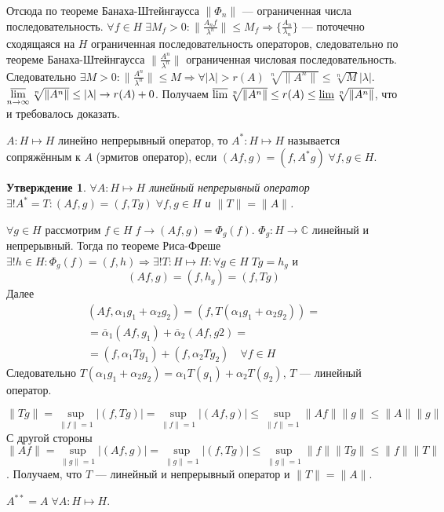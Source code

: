 \documentclass[12pt]{article}
\begin{document}
\begin{Proof}
    Отсюда по теореме Банаха-Штейнгаусса $\|\Phi_n\|$ --- ограниченная числа последовательность. $\forall f \in H\;\exists M_f > 0\colon \|\frac{A_n f}{\lambda^n}\|
    \le M_f \Rightarrow \{\frac{A_n}{\lambda_n}\}$ --- поточечно сходящаяся на $H$ ограниченная последовательность операторов, следовательно
    по теореме Банаха-Штейнгаусса $\|\frac{A^n}{\lambda^n}\|$ ограниченная числовая последовательность.
    Следовательно $\exists M>0\colon \|\frac{A^n}{\lambda^n}\| \le M \Rightarrow \forall |\lambda| > r(A)\;\sqrt[n]{\|A^n\|} \le \sqrt[n]{M}|\lambda|$.
    $\varlimsup\limits_{n \to \infty} \sqrt[n]{\|A^n\|} \le |\lambda| \to r(A) + 0$.
    Получаем $\varlimsup\sqrt[n]{\|A^n\|} \le r(A) \le \varliminf\sqrt[n]{\|A^n\|}$, что и требовалось доказать.
\end{Proof}

\begin{Opr}
    $A : H \mapsto H$ линейно непрерывный оператор, то $A^* : H \mapsto H$ называется сопряжённым к $A$ (эрмитов оператор),
    если $(Af, g) = (f, A^* g)\;\forall f, g \in H$.
\end{Opr}

\newtheorem{Utv}[Theor]{Утверждение}
\begin{Utv}
    $\forall A : H \mapsto H$ линейный непрерывный оператор $\exists! A^* = T\colon (Af, g) = (f, Tg)\;\forall f, g \in H$ и $\|T\| = \|A\|$.
\end{Utv}
\begin{Proof}
    $\forall g \in H$ рассмотрим $f \in H\;f \to (Af, g) = \Phi_g(f)$.
    $\Phi_g : H \to \mathbb C$ линейный и непрерывный.
    Тогда по теореме Риса-Фреше $\exists! h \in H\colon \Phi_g(f) = (f, h) \Rightarrow \exists! T : H \mapsto H\colon \forall g \in H\;Tg = h_g$ и
    $$
    (Af, g) = (f, h_g) = (f, Tg)
    $$
    Далее 
    \begin{multline*}
    (Af, \alpha_1 g_1 + \alpha_2 g_2) = (f, T(\alpha_1 g_1 + \alpha_2 g_2)) =\\ 
    = \overline{\alpha}_1 (Af, g_1) + \overline{\alpha}_2 (Af, g2) =\\
    = (f, \alpha_1 Tg_1) + (f, \alpha_2 Tg_2)\quad \forall f \in H
    \end{multline*}
    Следовательно $T(\alpha_1 g_1 + \alpha_2 g_2) = \alpha_1 T(g_1) + \alpha_2 T(g_2)$, $T$ --- линейный оператор.
    
 $$
 \|Tg\| = \sup\limits_{\|f\| = 1}|(f, Tg)| = \sup\limits_{\|f\| = 1}|(Af, g)| \le \sup\limits_{\|f\| = 1}\|Af\|\|g\| \le \|A\|\|g\|
 $$
    С другой стороны 
    $$
    \|Af\| = \sup\limits_{\|g\| = 1}|(Af, g)| = \sup\limits_{\|g\| = 1}|(f, Tg)| \le \sup\limits_{\|g\| = 1} \|f\| \|Tg\| \le \|f\| \|T\|
    $$.
    Получаем, что $T$ --- линейный и непрерывный оператор и $\|T\| = \|A\|$.
\end{Proof}
\begin{Upr}
    $A^{**} = A\;\forall A : H \mapsto H$.
\end{Upr}
\end{document}
